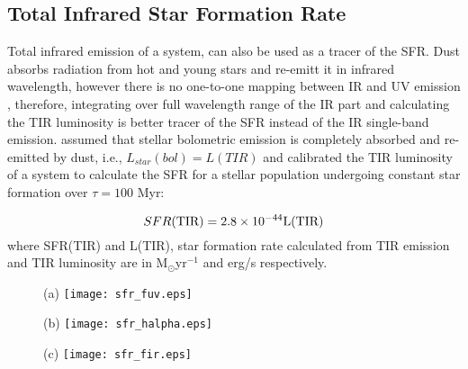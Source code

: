 \documentclass[useAMS,usenatbib]{mn2e}
\newcommand \halpha    {H$\alpha $\ }
\newcommand \um    {$\mu$m\ }
\begin{document}
\subsection{Total Infrared Star Formation Rate}
\label{sec:sfr_fir}
Total infrared emission of a system, can also be used as a tracer of the SFR. Dust absorbs radiation from hot and young stars and re-emitt it in infrared wavelength, however there is no one-to-one mapping between IR and UV emission \citep{Calzeti12}, therefore, integrating over full wavelength range of the IR part and calculating the TIR luminosity is better tracer of the SFR instead of the IR single-band emission. \cite{Calzetti07} assumed that stellar bolometric emission is completely absorbed and re-emitted by dust, i.e., $L_{star}(bol) = L(TIR)$ and calibrated the TIR luminosity of a system to calculate the SFR for a stellar population undergoing constant star formation over $\tau = 100$ Myr:

\begin{equation}
\label{equ:sfr_fir}
SFR(\rm TIR) = 2.8 \times10^{-44}L(\rm TIR)
\end{equation}
where SFR(TIR) and L(TIR), star formation rate calculated from TIR emission and TIR luminosity are in M$_{\odot}$yr$^{-1}$ and erg/s respectively.

\begin{figure*}
        \centering
        \begin{subfigure}\\(a){}
                \texttt{[image: sfr\_fuv.eps]}

               \label{fig:sfr_halpha}
        \end{subfigure}
        \begin{subfigure}\\(b){}
                \texttt{[image: sfr\_halpha.eps]}

               \label{fig:sfr_halpha}
        \end{subfigure}
        \begin{subfigure}\\(c){}
                \texttt{[image: sfr\_fir.eps]}

                \label{fig:sfr_fir_small}
        \end{subfigure}
         \quad
               \caption{SFR map from a combination of \halpha and 24\um emission (top) and total infrared emission (bottom)}
\label{ISOnIRS}
\end{figure*}
\end{document}
